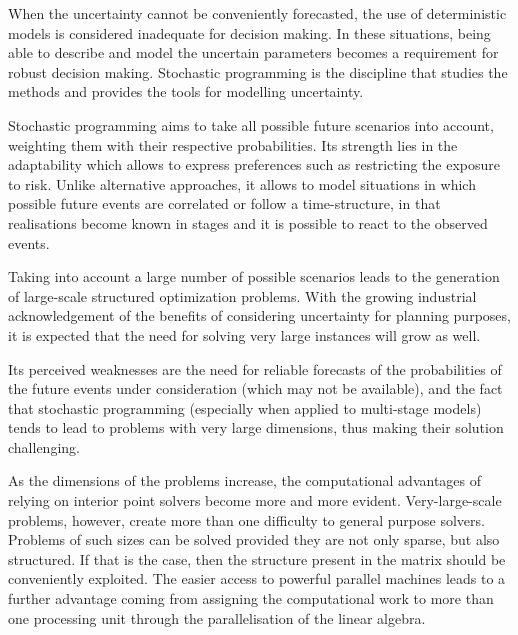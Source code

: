 
When the uncertainty cannot be conveniently forecasted, the use of 
deterministic models is considered inadequate for decision making. In 
these situations, being able to describe and model the uncertain parameters
becomes a requirement for robust decision making. Stochastic 
programming is the discipline that 
studies the methods and provides the tools for modelling uncertainty.

Stochastic programming aims to take all possible future scenarios 
into account, weighting them
with their respective probabilities. Its strength lies in the
adaptability which allows to express preferences such as restricting
the exposure to risk. Unlike alternative approaches, it allows to model
situations in which possible future events are correlated or follow a
time-structure, in that realisations become known in stages and it is
possible to react to the observed events.

Taking into account a large number of possible scenarios leads
to the generation of large-scale structured optimization problems.
With the growing industrial acknowledgement of the benefits of 
considering uncertainty for planning purposes, it is expected that the 
need for solving very large instances will grow as well.

Its perceived weaknesses are the need for reliable forecasts
of the probabilities of the future events under consideration
(which may not be available), and the fact that stochastic programming
(especially when applied to multi-stage models) tends to lead to
problems with very large dimensions, thus making their solution
challenging. 

As the dimensions of the problems increase, the computational advantages 
of relying on interior point solvers become more and more evident. 
Very-large-scale problems, however, create more than one difficulty to general 
purpose solvers.
Problems of such sizes can be solved provided they are not only sparse,
but also structured. If that is the case, then the structure present 
in the matrix should be conveniently exploited.
The easier access to powerful parallel machines leads to a 
further advantage coming from assigning the computational work 
to more than one processing unit through the parallelisation of 
the linear algebra.

